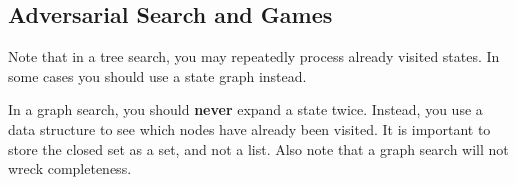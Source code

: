 
\subsection{Adversarial Search and Games}

Note that in a tree search, you may repeatedly process already visited states. In some cases you should use a state graph instead.

In a graph search, you should \textbf{never} expand a state twice. Instead, you use a data structure to see which nodes have already been visited. It is important to store the closed set as a set, and not a list. Also note that a graph search will not wreck completeness.
